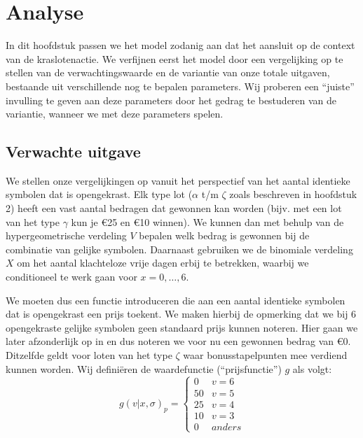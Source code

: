 \chapter{Analyse}\label{cha:analysis}

In dit hoofdstuk passen we het model zodanig aan dat het aansluit op de context van de kraslotenactie. We verfijnen eerst het model door een vergelijking op te stellen van de verwachtingswaarde en de variantie van onze totale uitgaven, bestaande uit verschillende nog te bepalen parameters. Wij proberen een ``juiste'' invulling te geven aan deze parameters door het gedrag te bestuderen van de variantie, wanneer we met deze parameters spelen.

\section{Verwachte uitgave}

We stellen onze vergelijkingen op vanuit het perspectief van het aantal identieke symbolen dat is opengekrast. Elk type lot ($\alpha$ t/m $\zeta$ zoals beschreven in hoofdstuk 2) heeft een vast aantal bedragen dat gewonnen kan worden (bijv. met een lot van het type $\gamma$ kun je \euro25 en \euro10 winnen). We kunnen dan met behulp van de hypergeometrische verdeling $V$ bepalen welk bedrag is gewonnen bij de combinatie van gelijke symbolen. Daarnaast gebruiken we de binomiale verdeling $X$ om het aantal klachteloze vrije dagen erbij te betrekken, waarbij we conditioneel te werk gaan voor $x=0,\ldots,6$.

We moeten dus een functie introduceren die aan een aantal identieke symbolen dat is opengekrast een prijs toekent. We maken hierbij de opmerking dat we bij 6 opengekraste gelijke symbolen geen standaard prijs kunnen noteren. Hier gaan we later afzonderlijk op in en dus noteren we voor nu een gewonnen bedrag van \euro0. Ditzelfde geldt voor loten van het type $\zeta$ waar bonusstapelpunten mee verdiend kunnen worden. Wij defini\"eren de waardefunctie (``prijsfunctie'') $g$ als volgt:
\begin{equation}
  g(v|x,\sigma)_{p} =
  \begin{cases}
     0 & v = 6\\
    50 & v = 5\\
    25 & v = 4\\
    10 & v = 3\\
    0 & anders
  \end{cases}
\end{equation}

